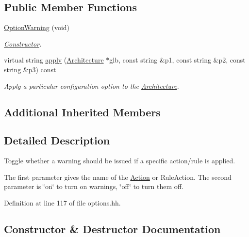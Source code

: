 \subsection*{Public Member Functions}
\begin{DoxyCompactItemize}
\item 
\mbox{\hyperlink{class_option_warning_a7d114b0e373078fe149ef0ee2d75ed22}{Option\+Warning}} (void)
\begin{DoxyCompactList}\small\item\em \mbox{\hyperlink{class_constructor}{Constructor}}. \end{DoxyCompactList}\item 
virtual string \mbox{\hyperlink{class_option_warning_af3b3ebf05120fe85d740e03a2e27b644}{apply}} (\mbox{\hyperlink{class_architecture}{Architecture}} $\ast$glb, const string \&p1, const string \&p2, const string \&p3) const
\begin{DoxyCompactList}\small\item\em Apply a particular configuration option to the \mbox{\hyperlink{class_architecture}{Architecture}}. \end{DoxyCompactList}\end{DoxyCompactItemize}
\subsection*{Additional Inherited Members}


\subsection{Detailed Description}
Toggle whether a warning should be issued if a specific action/rule is applied. 

The first parameter gives the name of the \mbox{\hyperlink{class_action}{Action}} or Rule\+Action. The second parameter is \char`\"{}on\char`\"{} to turn on warnings, \char`\"{}off\char`\"{} to turn them off. 

Definition at line 117 of file options.\+hh.



\subsection{Constructor \& Destructor Documentation}
\mbox{\label{class_option_warning_a7d114b0e373078fe149ef0ee2d75ed22}} 
